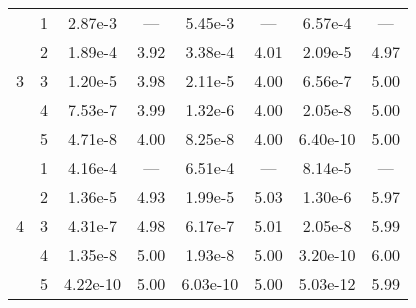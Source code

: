 \begin{table}
{\begin{tabular}{l c c c c c c c}
\midrule
\multirow{5}{*}{3}
 & 1 & 2.87e-3 & --- & 5.45e-3 & --- & 6.57e-4 & --- \\ 
 & 2 & 1.89e-4 & 3.92 & 3.38e-4 & 4.01 & 2.09e-5 & 4.97 \\ 
 & 3 & 1.20e-5 & 3.98 & 2.11e-5 & 4.00 & 6.56e-7 & 5.00 \\ 
 & 4 & 7.53e-7 & 3.99 & 1.32e-6 & 4.00 & 2.05e-8 & 5.00 \\ 
 & 5 & 4.71e-8 & 4.00 & 8.25e-8 & 4.00 & 6.40e-10 & 5.00 \\ 

\midrule
\multirow{5}{*}{4}
 & 1 & 4.16e-4 & --- & 6.51e-4 & --- & 8.14e-5 & --- \\ 
 & 2 & 1.36e-5 & 4.93 & 1.99e-5 & 5.03 & 1.30e-6 & 5.97 \\ 
 & 3 & 4.31e-7 & 4.98 & 6.17e-7 & 5.01 & 2.05e-8 & 5.99 \\ 
 & 4 & 1.35e-8 & 5.00 & 1.93e-8 & 5.00 & 3.20e-10 & 6.00 \\ 
 & 5 & 4.22e-10 & 5.00 & 6.03e-10 & 5.00 & 5.03e-12 & 5.99 \\ 

        \bottomrule
    \end{tabular}}
\end{table}

